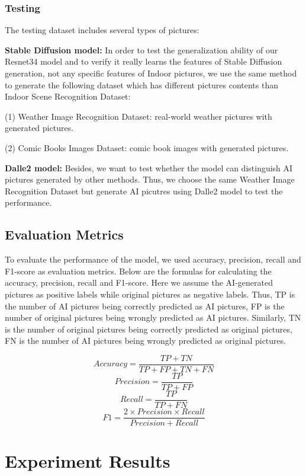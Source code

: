 \documentclass[11pt]{article}
\begin{document}
\subsubsection{Testing}

The testing dataset includes several types of pictures:

\textbf{Stable Diffusion model:} In order to test the generalization ability of our Resnet34 model and to verify it really learns the features of Stable Diffusion generation, not any specific features of Indoor pictures, we use the same method to generate the following dataset which has different pictures contents than Indoor Scene Recognition Dataset:

(1) Weather Image Recognition Dataset: real-world weather pictures with generated pictures.

(2) Comic Books Images Dataset: comic book images with generated pictures.

\textbf{Dalle2 model: } Besides, we want to test whether the model can distinguish AI pictures generated by other methods. Thus, we choose the same Weather Image Recognition Dataset but generate AI picutres using Dalle2 model to test the performance.

\subsection{Evaluation Metrics}

To evaluate the performance of the model, we used accuracy, precision, recall and F1-score as evaluation metrics. Below are the formulas for calculating the accuracy, precision, recall and F1-score. Here we assume the AI-generated pictures as positive labels while original pictures as negative labels. Thus, TP is the number of AI pictures being correctly predicted as AI pictures, FP is the number of original pictures being wrongly predicted as AI pictures. Similarly, TN is the number of original pictures being correctly predicted as original pictures, FN is the number of AI pictures being wrongly predicted as original pictures.

\[
  Accuracy = \frac{TP+TN}{TP+FP+TN+FN}
\]
\[
  Precision = \frac{TP}{TP+FP}
\]
\[
  Recall = \frac{TP}{TP+FN}
\]
\[
  F1 = \frac{2 \times Precision \times Recall}{Precision + Recall}
\]


\section{Experiment Results}
\end{document}
